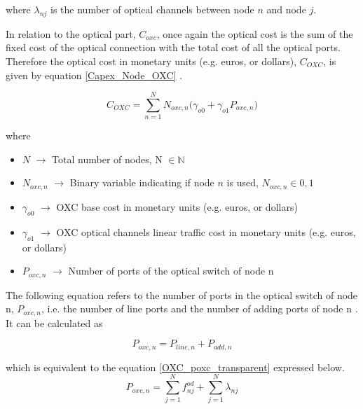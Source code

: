 \noindent
where $\lambda_{nj}$ is the number of optical channels between node $n$ and node $j$.

\vspace{11pt}

In relation to the optical part, $C_{oxc}$, once again the optical cost is the sum of the fixed cost of the optical connection with the total cost of all the optical ports. Therefore the optical cost in monetary units (e.g. euros, or dollars), $C_{OXC}$, is given by equation \ref{Capex_Node_OXC} \cite{TiagoEsteves}.

\begin{equation}
C_{OXC} = \sum_{n=1}^{N} N_{oxc,n} \bigg( \gamma_{o0} + \gamma_{o1} P_{oxc,n} \bigg)
\label{Capex_Node_OXC}
\end{equation}

\noindent
where
\begin{itemize}
\item{$N$				$\rightarrow$	Total number of nodes, N $\in \mathbb{N}$}
\item{$N_{oxc,n}$		$\rightarrow$	Binary variable indicating if node $n$ is used, $N_{oxc,n} \in {0, 1}$}
\item{$\gamma_{o0}$ 	$\rightarrow$	OXC base cost in monetary units (e.g. euros, or dollars)}
\item{$\gamma_{o1}$ 	$\rightarrow$	OXC optical channels linear traffic cost in monetary units (e.g. euros, or dollars) }
\item{$P_{oxc,n}$	    $\rightarrow$	Number of ports of the optical switch of node n}
\end{itemize}

\vspace{11pt}

The following equation refers to the number of ports in the optical switch of node n, $P_{oxc,n}$, i.e. the number of line ports and the number of adding ports of node n \cite{TiagoEsteves}. It can be calculated as

\begin{equation}
P_{oxc,n} = P_{line,n} + P_{add,n}
\label{OXC_poxc_transparent2}
\end{equation}

\noindent
which is equivalent to  the equation \ref{OXC_poxc_transparent} expressed below.\\

\begin{equation}
P_{oxc,n} = \sum_{j=1}^{N} f_{nj}^{od} + \sum_{j=1}^{N} \lambda_{nj}
\label{OXC_poxc_transparent}
\end{equation}

